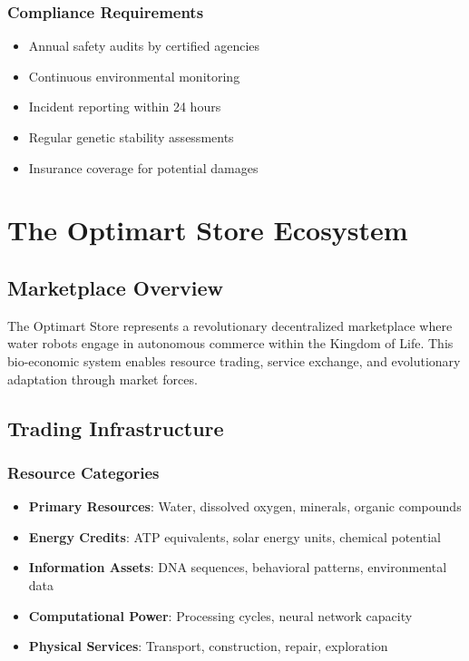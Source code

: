 \documentclass[11pt,a4paper]{article}
\begin{document}
\subsubsection{Compliance Requirements}
\begin{itemize}
    \item Annual safety audits by certified agencies
    \item Continuous environmental monitoring
    \item Incident reporting within 24 hours
    \item Regular genetic stability assessments
    \item Insurance coverage for potential damages
\end{itemize}

\section{The Optimart Store Ecosystem}
\label{sec:optimart}

\subsection{Marketplace Overview}

The Optimart Store represents a revolutionary decentralized marketplace where water robots engage in autonomous commerce within the Kingdom of Life. This bio-economic system enables resource trading, service exchange, and evolutionary adaptation through market forces.

\subsection{Trading Infrastructure}

\subsubsection{Resource Categories}
\begin{itemize}
    \item \textbf{Primary Resources}: Water, dissolved oxygen, minerals, organic compounds
    \item \textbf{Energy Credits}: ATP equivalents, solar energy units, chemical potential
    \item \textbf{Information Assets}: DNA sequences, behavioral patterns, environmental data
    \item \textbf{Computational Power}: Processing cycles, neural network capacity
    \item \textbf{Physical Services}: Transport, construction, repair, exploration
\end{itemize}
\end{document}
